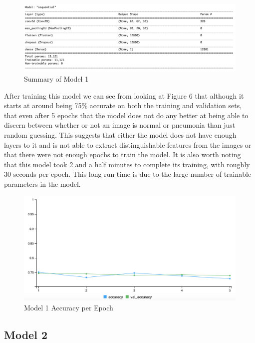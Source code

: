 \documentclass[12pt]{article}
\begin{document}
\begin{figure}

{\centering \includegraphics[width=0.75\linewidth,height=0.25\textheight]{images/model1} 

}

\caption{Summary of Model 1}\label{fig:sample-fig5}
\end{figure}

After training this model we can see from looking at Figure 6 that
although it starts at around being 75\% accurate on both the training
and validation sets, that even after 5 epochs that the model does not do
any better at being able to discern between whether or not an image is
normal or pneumonia than just random guessing. This suggests that either
the model does not have enough layers to it and is not able to extract
distinguishable features from the images or that there were not enough
epochs to train the model. It is also worth noting that this model took
2 and a half minutes to complete its training, with roughly 30 seconds
per epoch. This long run time is due to the large number of trainable
parameters in the model.

\begin{figure}

{\centering \includegraphics[width=0.75\linewidth,height=0.25\textheight]{images/model1out} 

}

\caption{Model 1 Accuracy per Epoch}\label{fig:sample-fig6}
\end{figure}

\hypertarget{model-2}{%
\subsection{Model 2}\label{model-2}}
\end{document}
